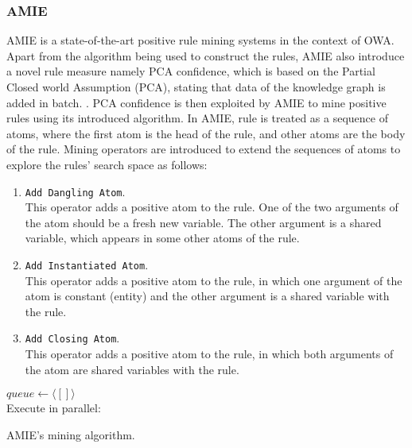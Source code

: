 \subsubsection{AMIE}
AMIE \cite{amie} is a state-of-the-art positive rule mining systems in the context of OWA. Apart from the algorithm being used to construct the rules, AMIE also introduce a novel rule measure namely PCA confidence, which is based on the Partial Closed world Assumption (PCA), stating that data of the knowledge graph is added in batch.
.
PCA confidence is then exploited by AMIE to mine positive rules using its introduced algorithm. In AMIE, rule is treated as a sequence of atoms, where the first atom is the head of the rule, and other atoms are the body of the rule. Mining operators are introduced to extend the sequences of atoms to explore the rules' search space as follows:
\begin{enumerate}
\item \texttt{Add Dangling Atom}.\\
  This operator adds a positive atom to the rule. One of the two arguments of the atom should be a fresh new variable. The other argument is a shared variable, which appears in some other atoms of the rule.
\item \texttt{Add Instantiated Atom}.\\
  This operator adds a positive atom to the rule, in which one argument of the atom is constant (entity) and the other argument is a shared variable with the rule.
\item \texttt{Add Closing Atom}.\\
  This operator adds a positive atom to the rule, in which both arguments of the atom are shared variables with the rule.
\end{enumerate}
\begin{algorithm}[H]
\DontPrintSemicolon
$queue\leftarrow \langle[]\rangle$\\
Execute in parallel:\\
\caption{AMIE's mining algorithm.}
\label{algor:amie}
\end{algorithm}

